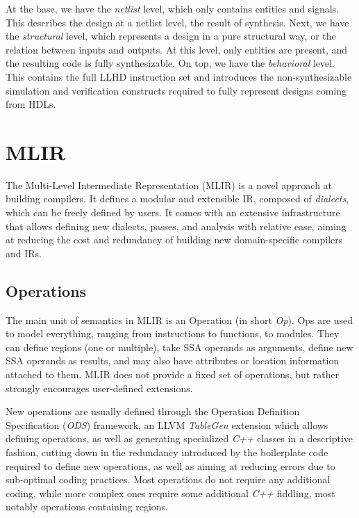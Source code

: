 At the base, we have the \textit{netlist} level, which only contains entities and signals. This describes the design at a netlist level, the result of synthesis. Next, we have the \textit{structural} level, which represents a design in a pure structural way, or the relation between inputs and outputs. At this level, only entities are present, and the resulting code is fully synthesizable. On top, we have the \textit{behavioral} level. This contains the full LLHD instruction set and introduces the non-synthesizable simulation and verification constructs required to fully represent designs coming from HDLs.


\section{MLIR}
\label{section:mlir}
The Multi-Level Intermediate Representation (MLIR) \cite{Lattner2020} is a novel approach at building compilers. It defines a modular and extensible IR, composed of \textit{dialects}, which can be freely defined by users. It comes with an extensive infrastructure that allows defining new dialects, passes, and analysis with relative ease, aiming at reducing the cost and redundancy of building new domain-specific compilers and IRs.


\subsection{Operations}
\label{section:mlir_ops}
The main unit of semantics in MLIR is an Operation (in short \textit{Op}). Ops are used to model everything, ranging from instructions to functions, to modules.  They can define regions (one or multiple), take SSA operands as arguments, define new SSA operands as results, and may also have attributes or location information attached to them. MLIR does not provide a fixed set of operations, but rather strongly encourages user-defined extensions.

New operations are usually defined through the Operation Definition Specification (\textit{ODS}) framework, an LLVM \textit{TableGen} \cite{tablegen} extension which allows defining operations, as well as generating specialized \textit{C++} classes in a descriptive fashion, cutting down in the redundancy introduced by the boilerplate code required to define new operations, as well as aiming at reducing errors due to sub-optimal coding practices. Most operations do not require any additional coding, while more complex ones require some additional \textit{C++} fiddling, most notably operations containing regions.

